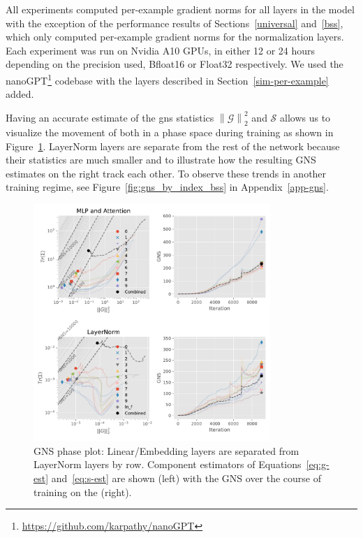 \documentclass{article}
\newcommand{\sqn}[1]{\left\lVert#1\right\rVert_2^2}
\begin{document}
All experiments computed
per-example gradient norms for all layers in the model with the exception of the
performance results of Sections~\ref{universal} and~\ref{bss}, which only
computed per-example gradient norms for the normalization layers. Each
experiment was run on Nvidia A10 GPUs, in either 12 or 24 hours depending on the
precision used, Bfloat16 or Float32 respectively. We used the
nanoGPT\footnote{\url{https://github.com/karpathy/nanoGPT}} codebase with the
layers described in Section~\ref{sim-per-example} added.

Having an accurate estimate of the \ac{gns} statistics $\sqn{\mathcal{G}}$ and
$\mathcal{S}$ allows us to visualize the movement of both in a phase space
during training as shown in Figure~\ref{fig:gns_by_index}. LayerNorm layers
are separate from the rest of the network because their statistics are much
smaller and to illustrate how the resulting GNS estimates on the right track
each other. To observe these trends in another training regime, see
Figure~\ref{fig:gns_by_index_bss} in Appendix~\ref{app-gns}.

\begin{figure}
    \centering
    \includegraphics[width=0.8\textwidth]{output_figures/gns_vs_trace.layer_idx.pdf}
    \caption{%
        GNS phase plot: Linear/Embedding layers are separated from LayerNorm
        layers by row. Component estimators of Equations~\ref{eq:g-est}
        and~\ref{eq:s-est} are shown (left) with the GNS over the course of
        training on the (right).}
    \label{fig:gns_by_index}
\end{figure}
\end{document}
